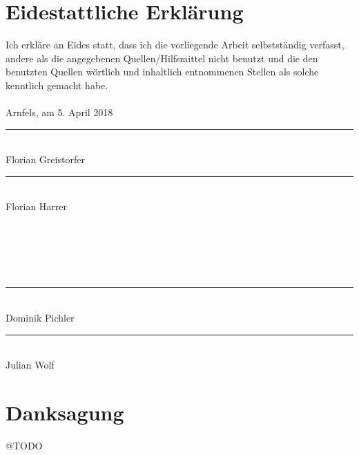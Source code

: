 \frontmatter
{}
\addtocounter{page}{2}

\rehead{}
\ohead[\pagemark]{\pagemark}

\newcommand{\doublesignature}[1]{%
  \parbox{\textwidth}{
    \hfill
    \parbox{7cm}{
      \centering
      \rule{6cm}{1pt}\\
      Florian Greistorfer
    }
    \parbox{7cm}{
      \centering
      \rule{6cm}{1pt}\\
      Florian Harrer
    }
  }
}
\newcommand{\doublesign}[1]{%
\mbox{}\\
\mbox{}\\
\mbox{}\\
\mbox{}\\
  \parbox{\textwidth}{
    \hfill
    \parbox{7cm}{
      \centering
      \rule{6cm}{1pt}\\
      Dominik Pichler
    }
    \parbox{7cm}{
      \centering
      \rule{6cm}{1pt}\\
      Julian Wolf
    }
  }
}

\vspace*{20pt}

\section*{Eidestattliche Erklärung}
\label{sec:eidestattliche-erklaerung}
Ich erkläre an Eides statt, dass ich die vorliegende Arbeit selbstständig verfasst, andere als die angegebenen
Quellen/Hilfsmittel nicht benutzt und die den benutzten Quellen wörtlich und inhaltlich entnommenen
Stellen als solche kenntlich gemacht habe.\\
\\
Arnfels, am 5. April 2018\\

\vskip 1cm

\doublesignature{}
\doublesign{}

\vskip 5cm

\clearpage

\newpage
\thispagestyle{empty}
\mbox{}

\clearpage

\section*{Danksagung}
\label{sec:danksagung}
@TODO

\clearpage

\newpage
\thispagestyle{empty}
\mbox{}

\clearpage

